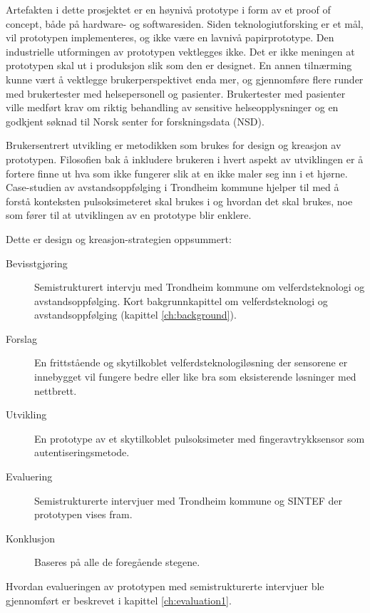 Artefakten i dette prosjektet er en høynivå prototype i form av et proof of concept, både på hardware- og softwaresiden.
Siden teknologiutforsking er et mål, vil
prototypen implementeres, og ikke være en lavnivå papirprototype. Den industrielle utformingen av prototypen vektlegges ikke. Det er
ikke meningen at prototypen skal ut i produksjon slik som den er designet. En annen tilnærming kunne vært å vektlegge brukerperspektivet enda mer,
og gjennomføre flere runder med brukertester med helsepersonell og pasienter. Brukertester med pasienter ville medført krav om
riktig behandling av sensitive helseopplysninger og en godkjent søknad til Norsk senter for forskningsdata (NSD).

Brukersentrert utvikling er metodikken som brukes for design og kreasjon av prototypen. Filosofien bak å inkludere brukeren i hvert aspekt
av utviklingen er å fortere finne ut hva som ikke fungerer slik at en ikke maler seg inn i et hjørne. Case-studien av avstandsoppfølging
i Trondheim kommune hjelper til med å forstå konteksten pulsoksimeteret skal brukes i og hvordan det skal brukes, noe
som fører til at utviklingen av en prototype blir enklere.

\begin{minipage}{\linewidth}
Dette er design og kreasjon-strategien oppsummert:\newline

\begin{description}
  \item [Bevisstgjøring] Semistrukturert intervju med Trondheim kommune om velferdsteknologi og avstandsoppfølging. Kort bakgrunnkapittel
      om velferdsteknologi og avstandsoppfølging (kapittel \ref{ch:background}).
  \item [Forslag] En frittstående og skytilkoblet velferdsteknologiløsning der sensorene er innebygget vil fungere bedre
      eller like bra som eksisterende løsninger med nettbrett.
  \item [Utvikling] En prototype av et skytilkoblet pulsoksimeter med fingeravtrykksensor som autentiseringsmetode.
  \item [Evaluering] Semistrukturerte intervjuer med Trondheim kommune og SINTEF der prototypen vises fram.
  \item [Konklusjon] Baseres på alle de foregående stegene.
\end{description}
\end{minipage}

Hvordan evalueringen av prototypen med semistrukturerte intervjuer ble gjennomført er beskrevet i kapittel \ref{ch:evaluation1}.

